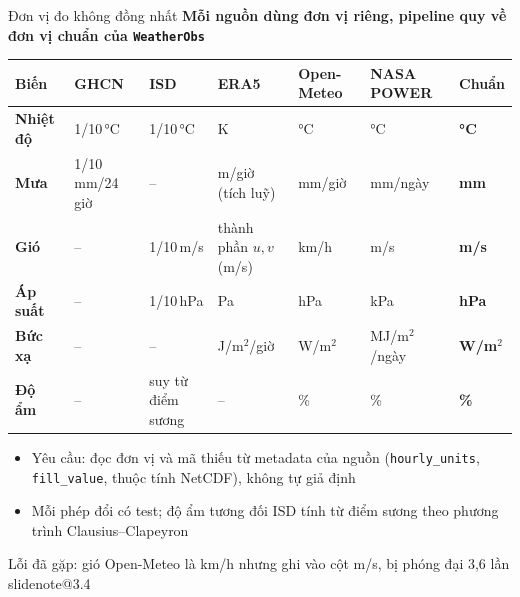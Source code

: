 \documentclass[t,aspectratio=169,12pt]{beamer}
\makeatletter
\newcommand{\slidenote}[1]{\ifcsname slidenote@#1\endcsname\note{\csname slidenote@#1\endcsname}\fi}
\newcommand{\ketluan}[1]{\vskip2mm{\color{hustred}#1}}
\newcommand{\ychinh}[1]{\vskip1mm{\bfseries #1}\par\vskip1mm}
\makeatother
\begin{document}
\begin{frame}{Đơn vị đo không đồng nhất}
  \ychinh{Mỗi nguồn dùng đơn vị riêng, pipeline quy về đơn vị chuẩn của \texttt{WeatherObs}}
  \centering\scriptsize
  \renewcommand{\arraystretch}{1.0}
  \begin{tabular}{@{}>{\bfseries}llllll>{\bfseries}l@{}}
    \toprule
    Biến & GHCN & ISD & ERA5 & Open-Meteo & NASA POWER & Chuẩn \\
    \midrule
    Nhiệt độ & 1/10\,°C & 1/10\,°C & K & °C & °C & °C \\
    Mưa & 1/10\,mm/24\,giờ & -- & m/giờ (tích luỹ) & mm/giờ & mm/ngày & mm \\
    Gió & -- & 1/10\,m/s & thành phần $u,v$ (m/s) & \textcolor{badred}{km/h} & m/s & m/s \\
    Áp suất & -- & 1/10\,hPa & Pa & hPa & \textcolor{badred}{kPa} & hPa \\
    Bức xạ & -- & -- & J/m$^2$/giờ & W/m$^2$ & MJ/m$^2$/ngày & W/m$^2$ \\
    Độ ẩm & -- & suy từ điểm sương & -- & \% & \% & \% \\
    \bottomrule
  \end{tabular}
  \raggedright
  \begin{itemize}\footnotesize\setlength\itemsep{0.5mm}
    \item Yêu cầu: đọc đơn vị và mã thiếu từ metadata của nguồn (\texttt{hourly\_units}, \texttt{fill\_value}, thuộc tính NetCDF), không tự giả định
    \item Mỗi phép đổi có test; độ ẩm tương đối ISD tính từ điểm sương theo phương trình Clausius--Clapeyron
  \end{itemize}
  \ketluan{\small Lỗi đã gặp: gió Open-Meteo là km/h nhưng ghi vào cột m/s, bị phóng đại 3,6 lần}
  \slidenote{3.4}
\end{frame}
\end{document}
